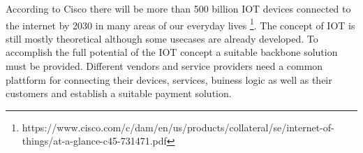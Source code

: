 \documentclass[
    ngerman,american
    ]{scrartcl}
\newcommand{\lang}{en}
\begin{document}
\begin{description}[style=unboxed]
            \item [\questionTwo{\lang}]
                According to Cisco there will be more than 500 billion IOT devices connected to the internet by 2030 in many areas of our everyday lives \footnote{https://www.cisco.com/c/dam/en/us/products/collateral/se/internet-of-things/at-a-glance-c45-731471.pdf}.
                The concept of IOT is still mostly theoretical although some usecases are already developed.
                To accomplish the full potential of the IOT concept a suitable backbone solution must be provided.
                Different vendors and service providers need a common plattform for connecting their devices, services, buiness logic as well as their customers and establish a suitable payment solution.



\end{description}
\end{document}
